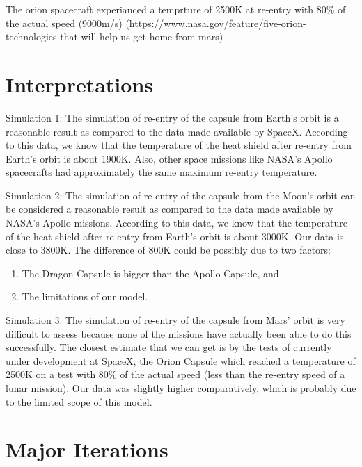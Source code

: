 \documentclass[11pt]{article}
\providecommand{\tightlist}{%
      \setlength{\itemsep}{0pt}\setlength{\parskip}{0pt}}
\begin{document}
    The orion spacecraft experianced a temprture of 2500K at re-entry with
80\% of the actual speed (9000m/s)
(https://www.nasa.gov/feature/five-orion-technologies-that-will-help-us-get-home-from-mars)

    \hypertarget{interpretations}{%
\section{Interpretations}\label{interpretations}}

    Simulation 1: The simulation of re-entry of the capsule from Earth's
orbit is a reasonable result as compared to the data made available by
SpaceX. According to this data, we know that the temperature of the heat
shield after re-entry from Earth's orbit is about 1900K. Also, other
space missions like NASA's Apollo spacecrafts had approximately the same
maximum re-entry temperature.

    Simulation 2: The simulation of re-entry of the capsule from the Moon's
orbit can be considered a reasonable result as compared to the data made
available by NASA's Apollo missions. According to this data, we know
that the temperature of the heat shield after re-entry from Earth's
orbit is about 3000K. Our data is close to 3800K. The difference of 800K
could be possibly due to two factors:

\begin{enumerate}
\def\labelenumi{(\roman{enumi})}
\tightlist
\item
  The Dragon Capsule is bigger than the Apollo Capsule, and
\item
  The limitations of our model.
\end{enumerate}

    Simulation 3: The simulation of re-entry of the capsule from Mars' orbit
is very difficult to assess because none of the missions have actually
been able to do this successfully. The closest estimate that we can get
is by the tests of currently under development at SpaceX, the Orion
Capsule which reached a temperature of 2500K on a test with 80\% of the
actual speed (less than the re-entry speed of a lunar mission). Our data
was slightly higher comparatively, which is probably due to the limited
scope of this model.

    \hypertarget{major-iterations}{%
\section{Major Iterations}\label{major-iterations}}
\end{document}
